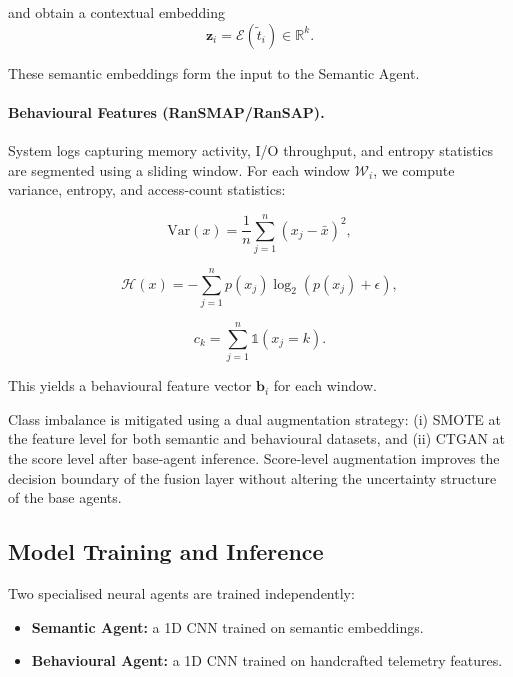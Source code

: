 \documentclass[lettersize,journal]{IEEEtran}
\begin{document}
and obtain a contextual embedding
\begin{equation}
\mathbf{z}_i = \mathcal{E}(\tilde{t}_i) \in \mathbb{R}^{k}.
\end{equation}

These semantic embeddings form the input to the Semantic Agent.

\paragraph{Behavioural Features (RanSMAP/RanSAP).}
System logs capturing memory activity, I/O throughput, and entropy statistics are segmented using a sliding window. For each window $\mathcal{W}_i$, we compute variance, entropy, and access-count statistics:

\begin{equation}
\mathrm{Var}(x) = \frac{1}{n}\sum_{j=1}^{n}(x_j - \bar{x})^2,
\end{equation}

\begin{equation}
\mathcal{H}(x) = -\sum_{j=1}^{n} p(x_j)\log_2(p(x_j)+\epsilon),
\end{equation}

\begin{equation}
c_k = \sum_{j=1}^{n} \mathbb{1}(x_j = k).
\end{equation}

This yields a behavioural feature vector $\mathbf{b}_i$ for each window.

Class imbalance is mitigated using a dual augmentation strategy: (i) SMOTE at the feature level for both semantic and behavioural datasets, and (ii) CTGAN at the score level after base-agent inference. Score-level augmentation improves the decision boundary of the fusion layer without altering the uncertainty structure of the base agents.

\subsection{Model Training and Inference}


Two specialised neural agents are trained independently:

\begin{itemize}
    \item \textbf{Semantic Agent:} a 1D CNN trained on semantic embeddings.
    \item \textbf{Behavioural Agent:} a 1D CNN trained on handcrafted telemetry features.
\end{itemize}
\end{document}
